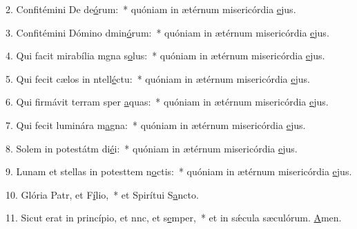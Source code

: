 2. Confitémini De de\uline{ó}rum:~* quóniam in ætérnum misericórdia \uline{e}jus.\par 
3. Confitémini Dómino dmin\uline{ó}rum:~* quóniam in ætérnum misericórdia \uline{e}jus.\par 
4. Qui facit mirabília mgna s\uline{o}lus:~* quóniam in ætérnum misericórdia \uline{e}jus.\par 
5. Qui fecit cælos in ntell\uline{é}ctu:~* quóniam in ætérnum misericórdia \uline{e}jus.\par 
6. Qui firmávit terram sper \uline{a}quas:~* quóniam in ætérnum misericórdia \uline{e}jus.\par 
7. Qui fecit luminára m\uline{a}gna:~* quóniam in ætérnum misericórdia \uline{e}jus.\par 
8. Solem in potestátm di\uline{é}i:~* quóniam in ætérnum misericórdia \uline{e}jus.\par 
9. Lunam et stellas in potesttem n\uline{o}ctis:~* quóniam in ætérnum misericórdia \uline{e}jus.\par 
10. Glória Patr, et F\uline{í}lio,~* et Spirítui S\uline{a}ncto.\par 
11. Sicut erat in princípio, et nnc, et s\uline{e}mper,~* et in sǽcula sæculórum. \uline{A}men.\par 
